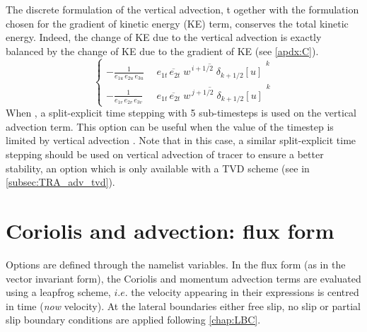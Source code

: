 \documentclass[../tex_main/NEMO_manual]{subfiles}
\begin{document}
The discrete formulation of the vertical advection, t
ogether with the formulation chosen for the gradient of kinetic energy (KE) term,
conserves the total kinetic energy.
Indeed, the change of KE due to the vertical advection is exactly balanced by
the change of KE due to the gradient of KE (see \autoref{apdx:C}).
\begin{equation} \label{eq:dynzad}
\left\{ 		\begin{aligned}
-\frac{1} {e_{1u}\,e_{2u}\,e_{3u}} &\ \overline{\ \overline{ e_{1t}\,e_{2t}\;w } ^{\,i+1/2}  \;\delta _{k+1/2} \left[ u \right]\  }^{\,k}  \\
-\frac{1} {e_{1v}\,e_{2v}\,e_{3v}}  &\ \overline{\ \overline{ e_{1t}\,e_{2t}\;w } ^{\,j+1/2}  \;\delta _{k+1/2} \left[ u \right]\  }^{\,k} 
\end{aligned}         \right.
\end{equation} 
When ,
a split-explicit time stepping with 5 sub-timesteps is used on the vertical advection term.
This option can be useful when the value of the timestep is limited by vertical advection \citep{Lemarie_OM2015}. 
Note that in this case,
a similar split-explicit time stepping should be used on vertical advection of tracer to ensure a better stability,
an option which is only available with a TVD scheme (see  in \autoref{subsec:TRA_adv_tvd}).


\section{Coriolis and advection: flux form}
\label{sec:DYN_adv_cor_flux}


Options are defined through the  namelist variables.
In the flux form (as in the vector invariant form),
the Coriolis and momentum advection terms are evaluated using a leapfrog scheme,
$i.e.$ the velocity appearing in their expressions is centred in time (\textit{now} velocity).
At the lateral boundaries either free slip,
no slip or partial slip boundary conditions are applied following \autoref{chap:LBC}.
\end{document}
